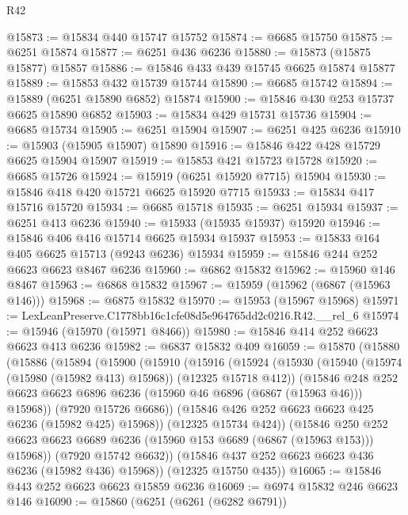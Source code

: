 \begin{lexlean}{R42}
\begin{coremodule}
{@15873 := @15834 @440 @15747 @15752
@15874 := @6685 @15750
@15875 := @6251 @15874
@15877 := @6251 @436 @6236
@15880 := @15873 (@15875 @15877) @15857
@15886 := @15846 @433 @439 @15745 @6625 @15874 @15877
@15889 := @15853 @432 @15739 @15744
@15890 := @6685 @15742
@15894 := @15889 (@6251 @15890 @6852) @15874
@15900 := @15846 @430 @253 @15737 @6625 @15890 @6852
@15903 := @15834 @429 @15731 @15736
@15904 := @6685 @15734
@15905 := @6251 @15904
@15907 := @6251 @425 @6236
@15910 := @15903 (@15905 @15907) @15890
@15916 := @15846 @422 @428 @15729 @6625 @15904 @15907
@15919 := @15853 @421 @15723 @15728
@15920 := @6685 @15726
@15924 := @15919 (@6251 @15920 @7715) @15904
@15930 := @15846 @418 @420 @15721 @6625 @15920 @7715
@15933 := @15834 @417 @15716 @15720
@15934 := @6685 @15718
@15935 := @6251 @15934
@15937 := @6251 @413 @6236
@15940 := @15933 (@15935 @15937) @15920
@15946 := @15846 @406 @416 @15714 @6625 @15934 @15937
@15953 := @15833 @164 @405 @6625 @15713 (@9243 @6236) @15934
@15959 := @15846 @244 @252 @6623 @6623 @8467 @6236
@15960 := @6862 @15832
@15962 := @15960 @146 @8467
@15963 := @6868 @15832
@15967 := @15959 (@15962 (@6867 (@15963 @146)))
@15968 := @6875 @15832
@15970 := @15953 (@15967 @15968)
@15971 := LexLeanPreserve.C1778bb16c1cfe08d5e964765dd2c0216.R42.__rel_6
@15974 := @15946 (@15970 (@15971 @8466))
@15980 := @15846 @414 @252 @6623 @6623 @413 @6236
@15982 := @6837 @15832 @409
@16059 := @15870
    (@15880
      (@15886
        (@15894
          (@15900
            (@15910
              (@15916
                (@15924
                  (@15930
                    (@15940 (@15974 (@15980 (@15982 @413) @15968)) (@12325 @15718 @412))
                    (@15846
                      @248
                      @252
                      @6623
                      @6623
                      @6896
                      @6236
                      (@15960 @46 @6896 (@6867 (@15963 @46)))
                      @15968))
                  (@7920 @15726 @6686))
                (@15846 @426 @252 @6623 @6623 @425 @6236 (@15982 @425) @15968))
              (@12325 @15734 @424))
            (@15846
              @250
              @252
              @6623
              @6623
              @6689
              @6236
              (@15960 @153 @6689 (@6867 (@15963 @153)))
              @15968))
          (@7920 @15742 @6632))
        (@15846 @437 @252 @6623 @6623 @436 @6236 (@15982 @436) @15968))
      (@12325 @15750 @435))
@16065 := @15846 @443 @252 @6623 @6623 @15859 @6236
@16069 := @6974 @15832 @246 @6623 @146
@16090 := @15860
    (@6251
      (@6261 (@6282 @6791))
}
\end{coremodule}
\end{lexlean}
